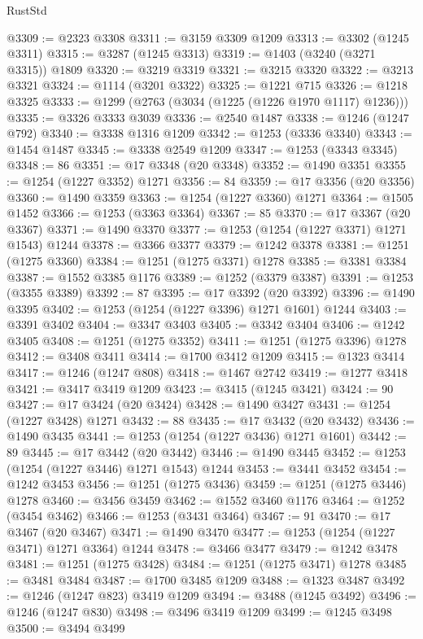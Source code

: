 \begin{lexlean}{RustStd}
\begin{coremodule}
@3309 := @2323 @3308
@3311 := @3159 @3309 @1209
@3313 := @3302 (@1245 @3311)
@3315 := @3287 (@1245 @3313)
@3319 := @1403 (@3240 (@3271 @3315)) @1809
@3320 := @3219 @3319
@3321 := @3215 @3320
@3322 := @3213 @3321
@3324 := @1114 (@3201 @3322)
@3325 := @1221 @715
@3326 := @1218 @3325
@3333 := @1299 (@2763 (@3034 (@1225 (@1226 @1970 @1117) @1236)))
@3335 := @3326 @3333 @3039
@3336 := @2540 @1487
@3338 := @1246 (@1247 @792)
@3340 := @3338 @1316 @1209
@3342 := @1253 (@3336 @3340)
@3343 := @1454 @1487
@3345 := @3338 @2549 @1209
@3347 := @1253 (@3343 @3345)
@3348 := 86
@3351 := @17 @3348 (@20 @3348)
@3352 := @1490 @3351
@3355 := @1254 (@1227 @3352) @1271
@3356 := 84
@3359 := @17 @3356 (@20 @3356)
@3360 := @1490 @3359
@3363 := @1254 (@1227 @3360) @1271
@3364 := @1505 @1452
@3366 := @1253 (@3363 @3364)
@3367 := 85
@3370 := @17 @3367 (@20 @3367)
@3371 := @1490 @3370
@3377 := @1253 (@1254 (@1227 @3371) @1271 @1543) @1244
@3378 := @3366 @3377
@3379 := @1242 @3378
@3381 := @1251 (@1275 @3360)
@3384 := @1251 (@1275 @3371) @1278
@3385 := @3381 @3384
@3387 := @1552 @3385 @1176
@3389 := @1252 (@3379 @3387)
@3391 := @1253 (@3355 @3389)
@3392 := 87
@3395 := @17 @3392 (@20 @3392)
@3396 := @1490 @3395
@3402 := @1253 (@1254 (@1227 @3396) @1271 @1601) @1244
@3403 := @3391 @3402
@3404 := @3347 @3403
@3405 := @3342 @3404
@3406 := @1242 @3405
@3408 := @1251 (@1275 @3352)
@3411 := @1251 (@1275 @3396) @1278
@3412 := @3408 @3411
@3414 := @1700 @3412 @1209
@3415 := @1323 @3414
@3417 := @1246 (@1247 @808)
@3418 := @1467 @2742
@3419 := @1277 @3418
@3421 := @3417 @3419 @1209
@3423 := @3415 (@1245 @3421)
@3424 := 90
@3427 := @17 @3424 (@20 @3424)
@3428 := @1490 @3427
@3431 := @1254 (@1227 @3428) @1271
@3432 := 88
@3435 := @17 @3432 (@20 @3432)
@3436 := @1490 @3435
@3441 := @1253 (@1254 (@1227 @3436) @1271 @1601)
@3442 := 89
@3445 := @17 @3442 (@20 @3442)
@3446 := @1490 @3445
@3452 := @1253 (@1254 (@1227 @3446) @1271 @1543) @1244
@3453 := @3441 @3452
@3454 := @1242 @3453
@3456 := @1251 (@1275 @3436)
@3459 := @1251 (@1275 @3446) @1278
@3460 := @3456 @3459
@3462 := @1552 @3460 @1176
@3464 := @1252 (@3454 @3462)
@3466 := @1253 (@3431 @3464)
@3467 := 91
@3470 := @17 @3467 (@20 @3467)
@3471 := @1490 @3470
@3477 := @1253 (@1254 (@1227 @3471) @1271 @3364) @1244
@3478 := @3466 @3477
@3479 := @1242 @3478
@3481 := @1251 (@1275 @3428)
@3484 := @1251 (@1275 @3471) @1278
@3485 := @3481 @3484
@3487 := @1700 @3485 @1209
@3488 := @1323 @3487
@3492 := @1246 (@1247 @823) @3419 @1209
@3494 := @3488 (@1245 @3492)
@3496 := @1246 (@1247 @830)
@3498 := @3496 @3419 @1209
@3499 := @1245 @3498
@3500 := @3494 @3499

\end{coremodule}
\end{lexlean}
